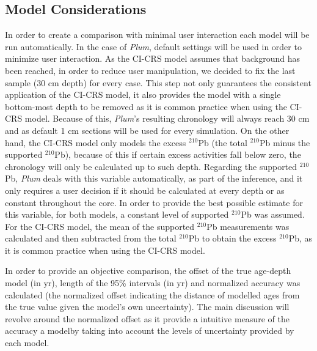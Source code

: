 \documentclass [10pt] {article}
\begin{document}
\subsection{Model Considerations}
In order to create a comparison with minimal user interaction each model will be run automatically.
In the case of \textit{Plum}, default settings will be used in order to minimize user interaction.
As the CI-CRS model assumes that background has been reached, in order to reduce user manipulation, we decided to fix the last sample (30 cm depth) for every case.
This step not only guarantees the consistent application of the CI-CRS model, it also provides the model with a single bottom-most depth to be removed as it is common practice when using the CI-CRS model.
Because of this, \textit{Plum}'s resulting chronology will always reach 30 cm and as default 1 cm sections will be used for every simulation.
On the other hand, the CI-CRS model only models the excess $^{210}$Pb (the total $^{210}$Pb minus the supported $^{210}$Pb), because of this if certain excess activities fall below zero, the chronology will only be calculated up to such depth.
Regarding the supported $^{210}$Pb, \textit{Plum} deals with this variable automatically, as part of the inference, and it only requires a user decision if it should be calculated at every depth or as constant throughout the core.
In order to provide the best possible estimate for this variable, for both models, a constant level of supported $^{210}$Pb was assumed.
For the CI-CRS model, the mean of the supported $^{210}$Pb measurements was calculated and then subtracted from the total $^{210}$Pb to obtain the excess $^{210}$Pb, as it is common practice when using the CI-CRS model.

In order to provide an objective comparison, the offset of the true age-depth model (in yr), length of the 95\% intervals (in yr) and normalized accuracy was calculated (the normalized offset indicating the distance of modelled ages from the true value given the model's own uncertainty). 
The main discussion will revolve around the normalized offset as it provide a intuitive measure of the accuracy a modelby taking into account the levels of uncertainty provided by each model. 


\end{document}

